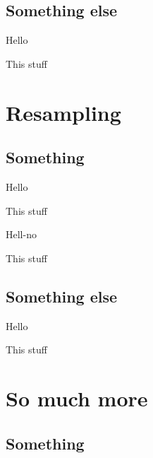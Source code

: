 \documentclass[
  ignorenonframetext,
]{beamer}
\begin{document}
\hypertarget{something-else-1}{%
\subsection{Something else}\label{something-else-1}}

\begin{frame}{Hello}
\protect\hypertarget{hello-10}{}

This stuff

\end{frame}

\hypertarget{resampling}{%
\section{Resampling}\label{resampling}}

\hypertarget{something-2}{%
\subsection{Something}\label{something-2}}

\begin{frame}{Hello}
\protect\hypertarget{hello-11}{}

This stuff

\end{frame}

\begin{frame}{Hell-no}
\protect\hypertarget{hell-no-2}{}

This stuff

\end{frame}

\hypertarget{something-else-2}{%
\subsection{Something else}\label{something-else-2}}

\begin{frame}{Hello}
\protect\hypertarget{hello-12}{}

This stuff

\end{frame}

\hypertarget{so-much-more}{%
\section{So much more}\label{so-much-more}}

\hypertarget{something-3}{%
\subsection{Something}\label{something-3}}
\end{document}
